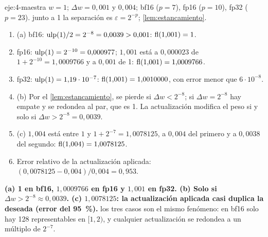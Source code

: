 \begin{solucion}{eje:4-maestra}
\datos $w=1$; $\Delta w=0{,}001$ y $0{,}004$; bf16 ($p=7$), fp16 ($p=10$), fp32 ($p=23$).
\planteamiento junto a 1 la separación es $\varepsilon=2^{-p}$; \cref{lem:estancamiento}.
\pasos
\begin{enumerate}[label=\arabic*.]
  \item (a) bf16: $\operatorname{ulp}(1)/2=2^{-8}=0{,}0039>0{,}001$: $\operatorname{fl}(1{,}001)=1$.
  \item fp16: $\operatorname{ulp}(1)=2^{-10}=0{,}000977$; $1{,}001$ está a $0{,}000023$ de $1+2^{-10}=1{,}0009766$ y a $0{,}001$ de 1: $\operatorname{fl}(1{,}001)=1{,}0009766$.
  \item fp32: $\operatorname{ulp}(1)=1{,}19\cdot 10^{-7}$: $\operatorname{fl}(1{,}001)=1{,}0010000$, con error menor que $6\cdot 10^{-8}$.
  \item (b) Por el \cref{lem:estancamiento}, se pierde si $\Delta w<2^{-8}$; si $\Delta w=2^{-8}$ hay empate y se redondea al par, que es 1. La actualización modifica el peso si y solo si $\Delta w>2^{-8}=0{,}0039$.
  \item (c) $1{,}004$ está entre $1$ y $1+2^{-7}=1{,}0078125$, a $0{,}004$ del primero y a $0{,}0038$ del segundo: $\operatorname{fl}(1{,}004)=1{,}0078125$.
  \item Error relativo de la actualización aplicada: $(0{,}0078125-0{,}004)/0{,}004=0{,}953$.
\end{enumerate}
\resultado \textbf{(a) 1 en bf16, $1{,}0009766$ en fp16 y $1{,}001$ en fp32. (b) Solo si $\Delta w>2^{-8}\approx 0{,}0039$. (c) $1{,}0078125$: la actualización aplicada casi duplica la deseada (error del 95~\%).}
\comprobacion los tres casos son el mismo fenómeno: en bf16 solo hay 128 representables en $[1,2)$, y cualquier actualización se redondea a un múltiplo de $2^{-7}$.
\end{solucion}

